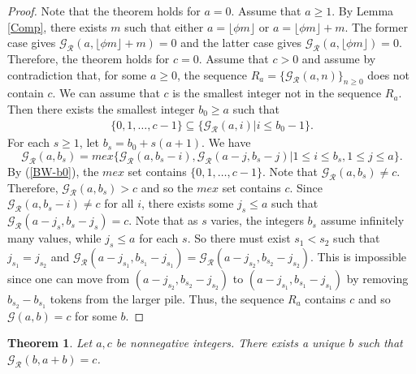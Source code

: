 \documentclass[12pt]{amsart}
\theoremstyle{plain}
\newtheorem{theorem}[proposition]{Theorem}
\theoremstyle{definition}
\theoremstyle{remark}
\begin{document}
\begin{proof}
Note that the theorem holds for $a = 0$. Assume that $a \geq 1$. By Lemma \ref{Comp}, there exists $m$ such that either $a = \lfloor \phi m \rfloor$ or $a = \lfloor \phi m \rfloor + m$. The former case gives ${\mathcal{G}}_{\mathcal{R}}(a,\lfloor \phi m \rfloor + m) = 0$ and the latter case gives ${\mathcal{G}}_{\mathcal{R}}(a,\lfloor \phi m \rfloor) = 0$. Therefore, the theorem holds for $c = 0$. Assume that $c > 0$ and assume by contradiction that, for some $a\geq 0$,  the sequence $R_a = \{{\mathcal{G}}_{\mathcal{R}}(a,n)\}_{n \geq 0}$ does not contain $c$. We can assume that $c$ is the smallest integer not in the sequence $R_a$. Then there exists the smallest integer $b_0 \geq a$ such that
\begin{align} \label{BW-b0}
\{0, 1, \ldots,c -1\} \subseteq \{{\mathcal{G}}_{\mathcal{R}}(a,i) | i \leq b_0-1\}.
\end{align}
For each $s \geq 1$, let $b_s = b_0+s(a+1)$. We have
\[
{\mathcal{G}}_{\mathcal{R}}(a,b_s) = mex\{{\mathcal{G}}_{\mathcal{R}}(a,b_s-i), {\mathcal{G}}_{\mathcal{R}}(a-j,b_s-j) | 1 \leq i  \leq b_s, 1 \leq j \leq a\}.
\]
By (\ref{BW-b0}), the $mex$ set contains $\{0, 1, \ldots,c -1\}$. Note that ${\mathcal{G}}_{\mathcal{R}}(a,b_s) \neq c$. Therefore, ${\mathcal{G}}_{\mathcal{R}}(a,b_s) >c $ and so the $mex$ set contains $c$. Since ${\mathcal{G}}_{\mathcal{R}}(a,b_s-i) \neq c $ for all $i$, there exists some $j_s \leq a$ such that ${\mathcal{G}}_{\mathcal{R}}(a-j_s,b_s-j_s) = c $. Note that as $s$ varies, the integers $b_s$ assume infinitely many values, while $j_s\leq a$ for each $s$.
 So there must exist $s_1 < s_2$ such that $j_{s_1} = j_{s_2}$ and ${\mathcal{G}}_{\mathcal{R}}(a-j_{s_1},b_{s_1}-j_{s_1}) = {\mathcal{G}}_{\mathcal{R}}(a-j_{s_2},b_{s_2}-j_{s_2})$. This is impossible since one can move from $(a-j_{s_2},b_{s_2}-j_{s_2})$ to $(a-j_{s_1},b_{s_1}-j_{s_1})$ by removing $b_{s_2}-b_{s_1}$ tokens from the larger pile. Thus, the sequence $R_a$ contains $c$ and so ${\mathcal{G}}(a,b) = c$ for some $b$.
\end{proof}

\smallskip
\begin{theorem} \label{BW-Diagonal}
Let $a, c$ be nonnegative integers. There exists a unique $b$ such that ${\mathcal{G}}_{\mathcal{R}}(b,a+b) =c$.
\end{theorem}
\end{document}

